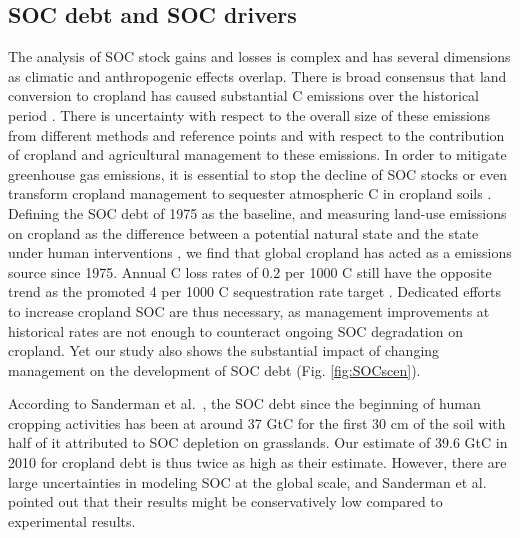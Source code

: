 \documentclass[gc, manuscript]{copernicus}
\begin{document}
\hypertarget{soc-debt-and-soc-drivers}{%
\subsection{SOC debt and SOC drivers}\label{soc-debt-and-soc-drivers}}

The analysis of SOC stock gains and losses is complex and has several dimensions as climatic and anthropogenic effects overlap. There is broad consensus that land conversion to cropland has caused substantial C emissions over the historical period \citep[e.g.~][]{frielingstein_glob_carbon_2020}. There is uncertainty with respect to the overall size of these emissions from different methods and reference points and with respect to the contribution of cropland and agricultural management to these emissions. In order to mitigate greenhouse gas emissions, it is essential to stop the decline of SOC stocks or even transform cropland management to sequester atmospheric C in cropland soils \citep{minasny_soil_2017}. Defining the SOC debt of 1975 as the baseline, and measuring land-use emissions on cropland as the difference between a potential natural state and the state under human interventions \citep[see][]{pugh_simulated_2015}, we find that global cropland has acted as a emissions source since 1975. Annual C loss rates of 0.2 per 1000 C still have the opposite trend as the promoted 4 per 1000 C sequestration rate target \citep{minasny_soil_2017}. Dedicated efforts to increase cropland SOC are thus necessary, as management improvements at historical rates are not enough to counteract ongoing SOC degradation on cropland. Yet our study also shows the substantial impact of changing management on the development of SOC debt (Fig. \ref{fig:SOCscen}).

According to Sanderman et al.~\citeyearpar{sanderman_soil_2017}, the SOC debt since the beginning of human cropping activities has been at around 37 GtC for the first 30 cm of the soil with half of it attributed to SOC depletion on grasslands. Our estimate of 39.6 GtC in 2010 for cropland debt is thus twice as high as their estimate. However, there are large uncertainties in modeling SOC at the global scale, and Sanderman et al.~\citeyearpar{sanderman_soil_2017} pointed out that their results might be conservatively low compared to experimental results.
\end{document}
